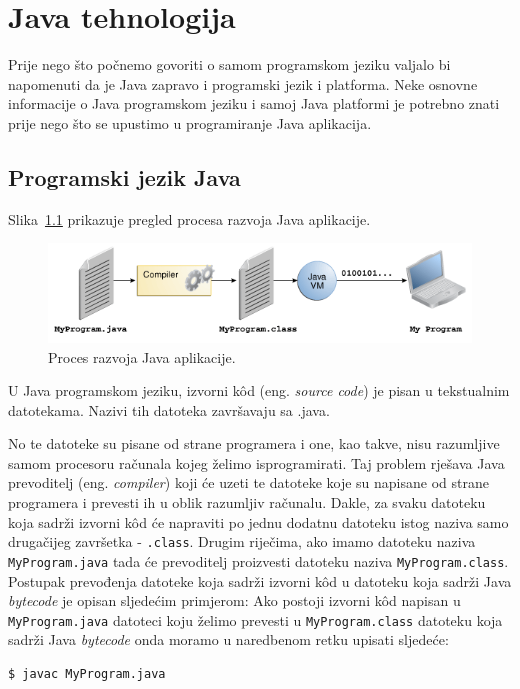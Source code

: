 \chapter{Java tehnologija}
Prije nego što počnemo govoriti o samom programskom jeziku valjalo bi napomenuti da je Java zapravo i programski jezik i platforma. Neke osnovne informacije o Java programskom jeziku i samoj Java platformi je potrebno znati prije nego što se upustimo u programiranje Java aplikacija.

\section{Programski jezik Java}
Slika~\ref{fig:software-development-process} prikazuje pregled procesa razvoja Java aplikacije.
\begin{figure}[h!]
    \label{fig:software-development-process}
    \caption{Proces razvoja Java aplikacije.}
    \centering
    \includegraphics[width=\textwidth]{java_programming_language_introduction/images/software-development-process}
\end{figure}

U Java programskom jeziku, izvorni kôd (eng. \emph{source code}) je pisan u tekstualnim datotekama. Nazivi tih datoteka završavaju sa .java.

No te datoteke su pisane od strane programera i one, kao takve, nisu razumljive samom procesoru računala kojeg želimo isprogramirati. Taj problem rješava Java prevoditelj (eng. \emph{compiler}) koji će uzeti te datoteke koje su napisane od strane programera i prevesti ih u oblik razumljiv računalu. Dakle, za svaku datoteku koja sadrži izvorni kôd će napraviti po jednu dodatnu datoteku istog naziva samo drugačijeg završetka - \texttt{.class}. Drugim riječima, ako imamo datoteku naziva \texttt{MyProgram.java} tada će prevoditelj proizvesti datoteku naziva \texttt{MyProgram.class}. Postupak prevođenja datoteke koja sadrži izvorni kôd u datoteku koja sadrži Java \emph{bytecode} je opisan sljedećim primjerom: Ako postoji izvorni kôd napisan u \texttt{MyProgram.java} datoteci koju želimo prevesti u \texttt{MyProgram.class} datoteku koja sadrži Java \emph{bytecode} onda moramo u naredbenom retku upisati sljedeće:

\begin{lstlisting}
$ javac MyProgram.java
\end{lstlisting}
